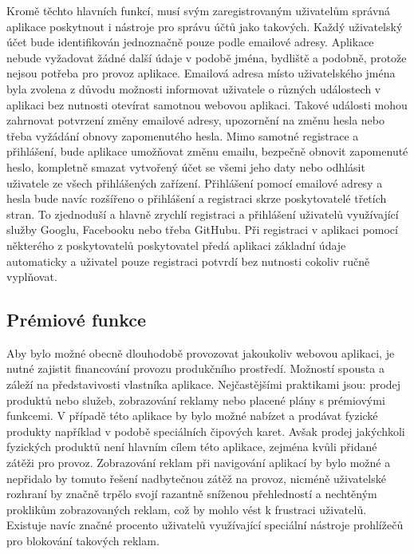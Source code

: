 	Kromě těchto hlavních funkcí, musí svým zaregistrovaným uživatelům správná aplikace poskytnout
	i nástroje pro správu účtů jako takových.
	Každý uživatelský účet bude identifikován jednoznačně pouze podle emailové adresy.
	Aplikace nebude vyžadovat žádné další údaje v podobě jména, bydliště a podobně, protože nejsou potřeba pro
	provoz aplikace.
	Emailová adresa místo uživatelského jména byla zvolena z důvodu možnosti informovat uživatele o různých událostech
	v aplikaci bez nutnosti otevírat samotnou webovou aplikaci.
	Takové události mohou zahrnovat potvrzení změny emailové adresy, upozornění na změnu hesla nebo třeba vyžádání obnovy
	zapomenutého hesla.
	Mimo samotné registrace a přihlášení, bude aplikace umožňovat změnu emailu, bezpečně obnovit zapomenuté heslo, kompletně
	smazat vytvořený účet se všemi jeho daty nebo odhlásit uživatele ze všech přihlášených zařízení.
	Přihlášení pomocí emailové adresy a hesla bude navíc rozšířeno o přihlášení a registraci skrze poskytovatelé třetích stran.
	To zjednoduší a hlavně zrychlí registraci a přihlášení uživatelů využívající služby Googlu, Facebooku nebo třeba
	GitHubu.
	Při registraci v aplikaci pomocí některého z poskytovatelů poskytovatel předá aplikaci základní údaje automaticky
	a uživatel pouze registraci potvrdí bez nutnosti cokoliv ručně vyplňovat.

	\subsection{Prémiové funkce}

	Aby bylo možné obecně dlouhodobě provozovat jakoukoliv webovou aplikaci, je nutné zajistit financování provozu
	produkčního prostředí.
	Možností spousta a záleží na představivosti vlastníka aplikace.
	Nejčastějšími praktikami jsou: prodej produktů nebo služeb, zobrazování reklamy nebo placené plány s prémiovými funkcemi.
	V případě této aplikace by bylo možné nabízet a prodávat fyzické produkty například v podobě speciálních čipových karet.
	Avšak prodej jakýchkoli fyzických produktů není hlavním cílem této aplikace, zejména kvůli přidané zátěži
	pro provoz.
	Zobrazování reklam při navigování aplikací by bylo možné a nepřidalo by tomuto řešení nadbytečnou zátěž na provoz,
	nicméně uživatelské rozhraní by značně trpělo svojí razantně sníženou přehledností a nechtěným proklikům zobrazovaných
	reklam, což by mohlo vést k frustraci uživatelů.
	Existuje navíc značné procento uživatelů využívající speciální nástroje prohlížečů pro blokování takových reklam.

